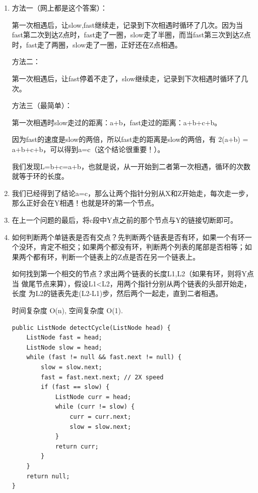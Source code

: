 \documentclass[12pt]{book}
\begin{document}
\begin{enumerate}
\item 方法一（网上都是这个答案）：
\label{sec-3-2-11-1}

第一次相遇后，让slow,fast继续走，记录到下次相遇时循环了几次。因为当fast第二次到达Z点时，fast走了一圈，slow走了半圈，而当fast第三次到达Z点时，fast走了两圈，slow走了一圈，正好还在Z点相遇。

方法二：

第一次相遇后，让fast停着不走了，slow继续走，记录到下次相遇时循环了几次。

方法三（最简单）：

第一次相遇时slow走过的距离：a+b，fast走过的距离：a+b+c+b。

因为fast的速度是slow的两倍，所以fast走的距离是slow的两倍，有 2(a+b) = a+b+c+b，可以得到a=c（这个结论很重要！）。

我们发现L=b+c=a+b，也就是说，从一开始到二者第一次相遇，循环的次数就等于环的长度。

\item 我们已经得到了结论a=c，那么让两个指针分别从X和Z开始走，每次走一步，那么正好会在Y相遇！也就是环的第一个节点。
\label{sec-3-2-11-2}

\item 在上一个问题的最后，将c段中Y点之前的那个节点与Y的链接切断即可。
\label{sec-3-2-11-3}

\item 如何判断两个单链表是否有交点？先判断两个链表是否有环，如果一个有环一个没环，肯定不相交；如果两个都没有环，判断两个列表的尾部是否相等；如果两个都有环，判断一个链表上的Z点是否在另一个链表上。
\label{sec-3-2-11-4}

如何找到第一个相交的节点？求出两个链表的长度L1,L2（如果有环，则将Y点当
做尾节点来算），假设L1<L2，用两个指针分别从两个链表的头部开始走，长度
为L2的链表先走(L2-L1)步，然后两个一起走，直到二者相遇。

时间复杂度 O(n), 空间复杂度 O(1). 

\lstset{language=java,label= ,caption= ,numbers=none}
\begin{lstlisting}
public ListNode detectCycle(ListNode head) {
    ListNode fast = head;
    ListNode slow = head;
    while (fast != null && fast.next != null) {
        slow = slow.next;
        fast = fast.next.next; // 2X speed
        if (fast == slow) {
            ListNode curr = head;
            while (curr != slow) {
                curr = curr.next;
                slow = slow.next;
            }
            return curr;
        }
    }
    return null;
}
\end{lstlisting}
\end{enumerate}
\end{document}
